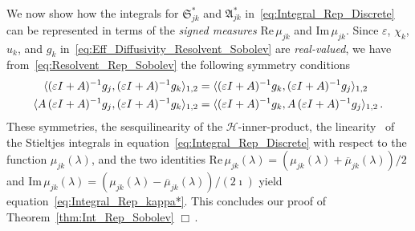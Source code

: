 \documentclass[english,12pt,jmp,graphicx]{revtex4-1}
\newcommand{\thmref}[1]{Theorem~\ref{#1}}
\newcommand{\Sg}{\mathfrak{S}}
\newcommand{\Ag}{\mathfrak{A}}
\newcommand{\Hs}{\mathscr{H}}
\newcommand{\Real}{\mbox{Re}\,}
\newcommand{\Imag}{\mbox{Im}\,}
\begin{document}
We now show how the integrals for $\Sg^*_{jk}$ and $\Ag^*_{jk}$
in~\eqref{eq:Integral_Rep_Discrete} can
be represented in terms of the 
\emph{signed measures} $\Real\mu_{jk}$ and $\Imag\mu_{jk}$. Since
$\varepsilon$, $\chi_k$, $u_k$, and $g_k$ 
in~\eqref{eq:Eff_Diffusivity_Resolvent_Sobolev} are \emph{real-valued}, we
have from~\eqref{eq:Resolvent_Rep_Sobolev} the following symmetry conditions 
%
\begin{align}\label{eq:Fnal_symm}
  \langle(\varepsilon I+A)^{-1} g_j,(\varepsilon I+A)^{-1}g_k\rangle_{1,2}
   &=\langle(\varepsilon I+A)^{-1}g_k,(\varepsilon I+A)^{-1}g_j\rangle_{1,2}\\
   \langle A\,(\varepsilon I+A)^{-1} g_j,(\varepsilon I+A)^{-1}g_k\rangle_{1,2}
   &=\langle(\varepsilon I+A)^{-1}g_k,A\,(\varepsilon I+A)^{-1}g_j\rangle_{1,2}\,.
   \notag
\end{align}
%
These symmetries, the sesquilinearity of the $\Hs$-inner-product, the
linearity~\cite{Stone:64} of the Stieltjes integrals
in equation~\eqref{eq:Integral_Rep_Discrete} with respect to the function
$\mu_{jk}(\lambda)$, and
the two identities
$\Real\mu_{jk}(\lambda)
=(\mu_{jk}(\lambda)+\overline{\mu}_{jk}(\lambda))/2$
and 
$\Imag\mu_{jk}(\lambda)
=(\mu_{jk}(\lambda)-\overline{\mu}_{jk}(\lambda))/(2\imath)$
yield
equation~\eqref{eq:Integral_Rep_kappa*}. 
This concludes our proof of \thmref{thm:Int_Rep_Sobolev} $\Box\,.$
\end{document}
